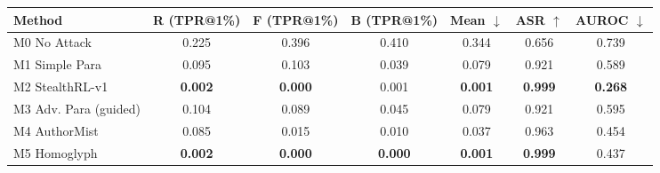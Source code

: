 \begin{tabular}{lcccccc}
\toprule
Method & R (TPR@1\%) & F (TPR@1\%) & B (TPR@1\%) & Mean $\downarrow$ & ASR $\uparrow$ & AUROC $\downarrow$ \\
\midrule
M0 No Attack & 0.225 & 0.396 & 0.410 & 0.344 & 0.656 & 0.739 \\
M1 Simple Para & 0.095 & 0.103 & 0.039 & 0.079 & 0.921 & 0.589 \\
M2 StealthRL-v1 & \textbf{0.002} & \textbf{0.000} & 0.001 & \textbf{0.001} & \textbf{0.999} & \textbf{0.268} \\
M3 Adv. Para (guided) & 0.104 & 0.089 & 0.045 & 0.079 & 0.921 & 0.595 \\
M4 AuthorMist & 0.085 & 0.015 & 0.010 & 0.037 & 0.963 & 0.454 \\
M5 Homoglyph & \textbf{0.002} & \textbf{0.000} & \textbf{0.000} & \textbf{0.001} & \textbf{0.999} & 0.437 \\
\bottomrule
\end{tabular}
